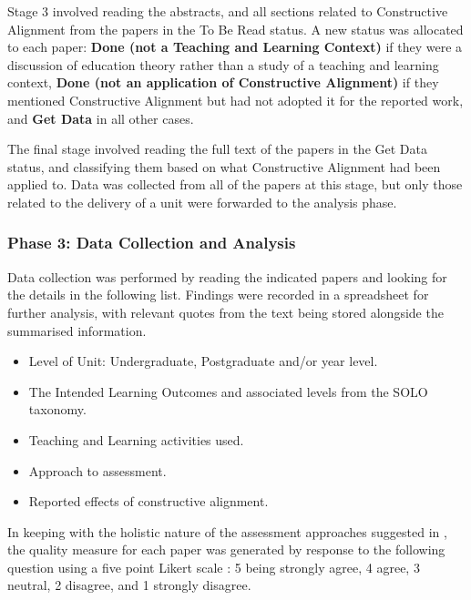 Stage 3 involved reading the abstracts, and all sections related to Constructive Alignment from the papers in the To Be Read status. A new status was allocated to each paper: \textbf{Done (not a Teaching and Learning Context)} if they were a discussion of education theory rather than a study of a teaching and learning context, \textbf{Done (not an application of Constructive Alignment)} if they mentioned Constructive Alignment but had not adopted it for the reported work, and \textbf{Get Data} in all other cases.

The final stage involved reading the full text of the papers in the Get Data status, and classifying them based on what Constructive Alignment had been applied to. Data was collected from all of the papers at this stage, but only those related to the delivery of a unit were forwarded to the analysis phase.


\subsubsection{Phase 3: Data Collection and Analysis} %
\label{ssub:data_collection_and_analysis}

Data collection was performed by reading the indicated papers and looking for the details in the following list. Findings were recorded in a spreadsheet for further analysis, with relevant quotes from the text being stored alongside the summarised information.

\begin{itemize}[noitemsep,nolistsep]
	\item Level of Unit: Undergraduate, Postgraduate and/or year level.
	\item The Intended Learning Outcomes and associated levels from the SOLO taxonomy.
	\item Teaching and Learning activities used.
	\item Approach to assessment.
	\item Reported effects of constructive alignment.
\end{itemize}

In keeping with the holistic nature of the assessment approaches suggested in \cite{Biggs:1997}, the quality measure for each paper was generated by response to the following question using a five point Likert scale \cite{Likert:1932}: 5 being strongly agree, 4 agree, 3 neutral, 2 disagree, and 1 strongly disagree.

